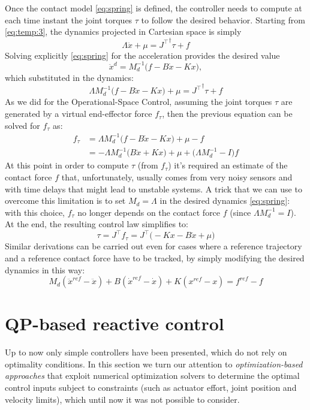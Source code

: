 	Once the contact model \eqref{eq:spring} is defined, the controller needs to compute at each time instant the joint torques $\tau$ to follow the desired behavior. 
	Starting from \eqref{eq:temp:3}, the dynamics projected in Cartesian space is simply 
	$$
	\Lambda \ddot x + \mu = {J^\top}^\dagger \tau + f
	$$
	Solving explicitly \eqref{eq:spring} for the acceleration provides the desired value 
	$$
	\ddot x^d = M_d^{-1}\big(f-B\dot x - Kx\big),
	$$ 
	which substituted in the dynamics:
	\[ \Lambda M_d^{-1}\big(f - B\dot x - K x\big) + \mu = {J^\top}^\dagger \tau + f \]
	As we did for the Operational-Space Control, assuming the joint torques $\tau$ are generated by a virtual end-effector force $f_\tau$, then the previous equation can be solved for $f_\tau$ as:
	\begin{align*}
		f_\tau & = \Lambda M_d ^{-1} \big( f - B\dot x - Kx \big) + \mu - f \\
		& = -\Lambda M_d^{-1}\big(B\dot x + K x\big) + \mu + \big(\Lambda M_d^{-1} - I\big) f
	\end{align*}
	At this point in order to compute $\tau$ (from $f_\tau$) it's required an estimate of the contact force $f$ that, unfortunately, usually comes from very noisy sensors and with time delays that might lead to unstable systems. A trick that we can use to overcome this limitation is to set $M_d = \Lambda$ in the desired dynamics \eqref{eq:spring}: with this choice, $f_\tau$ no longer depends on the contact force $f$ (since $\Lambda M_d^{-1} = I$). 
	At the end, the resulting control law simplifies to:
	\begin{equation}
		\tau = J^\top f_\tau = J^\top \big(-Kx - B\dot x + \mu\big)
	\end{equation}
	Similar derivations can be carried out even for cases where a reference trajectory and a reference contact force have to be tracked, by simply modifying the desired dynamics in this way:
	\begin{equation} \label{eq:spring}
		M_d (\ddot x^{ref} - \ddot x) + B (\dot x^{ref} - \dot x) + K (x^{ref} - x) = f^{ref} - f
	\end{equation}
	
\section{QP-based reactive control}
	Up to now only simple controllers have been presented, which do not rely on optimality conditions. In this section we turn our attention to \textit{optimization-based approaches} that exploit numerical optimization solvers to determine the optimal control inputs subject to constraints (such as actuator effort, joint position and velocity limits), which until now it was not possible to consider.
	
